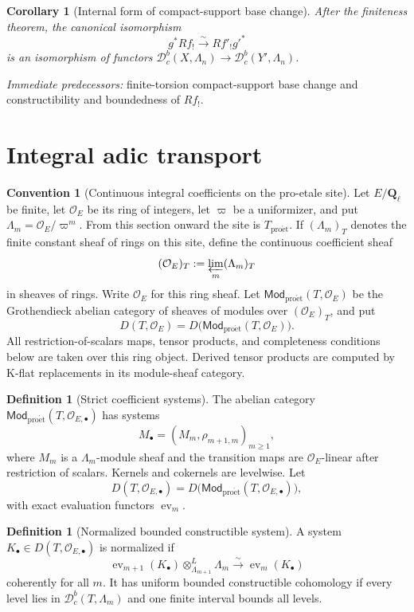 \documentclass[10pt]{article}
\newtheorem{corollary}[theorem]{Corollary}
\theoremstyle{definition}
\newtheorem{definition}[theorem]{Definition}
\newtheorem{convention}[theorem]{Convention}
\newcommand{\Ql}{\mathbf Q_\ell}
\newcommand{\Dbc}{\mathcal D^b_c}
\newcommand{\Mod}{\mathsf{Mod}}
\newcommand{\pred}[1]{\par\smallskip\begingroup\footnotesize\raggedright
\emph{Immediate predecessors:} #1.\par\endgroup}
\begin{document}
\begin{corollary}[Internal form of compact-support base change]
After the finiteness theorem, the canonical isomorphism
\[
 g^*Rf_!\xrightarrow{\sim}Rf'_!g'^*
\]
is an isomorphism of functors
\(\Dbc(X,\Lambda_n)\to\Dbc(Y',\Lambda_n)\).
\end{corollary}
\pred{finite-torsion compact-support base change and constructibility and boundedness of \(Rf_!\)}

\section{Integral adic transport}

\begin{convention}[Continuous integral coefficients on the pro-etale site]
Let \(E/\Ql\) be finite, let \(\mathcal O_E\) be its ring of integers, let
\(\varpi\) be a uniformizer, and put
\(\Lambda_m=\mathcal O_E/\varpi^m\).  From this section onward the site is
\(T_{\mathrm{pro\acute et}}\).  If \((\Lambda_m)_T\) denotes the finite
constant sheaf of rings on this site, define the continuous coefficient
sheaf
\[
 (\mathcal O_E)_T:=\varprojlim_m(\Lambda_m)_T
\]
in sheaves of rings.  Write \(\mathcal O_E\) for this ring sheaf.  Let
\(\Mod_{\mathrm{pro\acute et}}(T,\mathcal O_E)\) be the Grothendieck abelian category of
sheaves of modules over \((\mathcal O_E)_T\), and put
\[
 D(T,\mathcal O_E)=D\bigl(\Mod_{\mathrm{pro\acute et}}(T,\mathcal O_E)\bigr).
\]
All restriction-of-scalars maps, tensor products, and completeness
conditions below are taken over this ring object.  Derived tensor products
are computed by K-flat replacements in its module-sheaf category.
\end{convention}

\begin{definition}[Strict coefficient systems]
The abelian category
\(\Mod_{\mathrm{pro\acute et}}(T,\mathcal O_{E,\bullet})\) has systems
\[
 M_\bullet=(M_m,\rho_{m+1,m})_{m\ge1},
\]
where \(M_m\) is a \(\Lambda_m\)-module sheaf and the transition maps are
\(\mathcal O_E\)-linear after restriction of scalars.  Kernels and
cokernels are levelwise.  Let
\[
 D(T,\mathcal O_{E,\bullet})=
 D\bigl(\Mod_{\mathrm{pro\acute et}}(T,\mathcal O_{E,\bullet})\bigr),
\]
with exact evaluation functors \(\operatorname{ev}_m\).
\end{definition}

\begin{definition}[Normalized bounded constructible system]
A system \(K_\bullet\in D(T,\mathcal O_{E,\bullet})\) is normalized if
\[
 \operatorname{ev}_{m+1}(K_\bullet)
 \otimes^L_{\Lambda_{m+1}}\Lambda_m
 \xrightarrow{\sim}\operatorname{ev}_m(K_\bullet)
\]
coherently for all \(m\).  It has uniform bounded constructible cohomology
if every level lies in \(\Dbc(T,\Lambda_m)\) and one finite interval bounds
all levels.
\end{definition}
\end{document}
